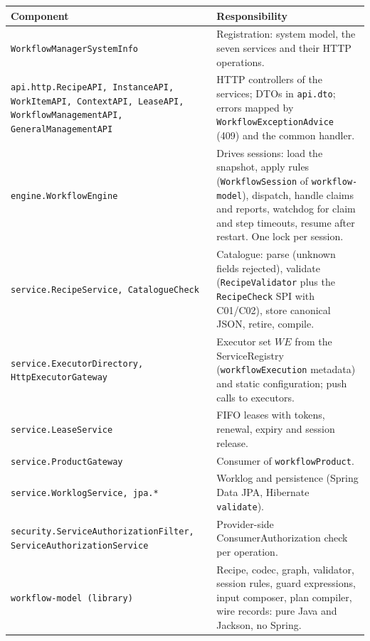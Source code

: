 \documentclass[a4paper]{arrowhead}
\begin{document}
{\small
\begin{longtable}{|p{6.2cm}|p{9.6cm}|}

\hline
\rowcolor{gray!33} Component & Responsibility \\ \hline
\endhead
{\footnotesize \texttt{WorkflowManagerSystemInfo}} & Registration: system model, the seven services and their HTTP operations. \\ \hline
{\footnotesize \texttt{api.\allowbreak{}http.\allowbreak{}RecipeAPI,\allowbreak{} InstanceAPI,\allowbreak{} WorkItemAPI,\allowbreak{} ContextAPI,\allowbreak{} LeaseAPI,\allowbreak{} WorkflowManagementAPI,\allowbreak{} GeneralManagementAPI}} & HTTP controllers of the services; DTOs in \texttt{api.dto}; errors mapped by \texttt{WorkflowExceptionAdvice} (409) and the common handler. \\ \hline
{\footnotesize \texttt{engine.\allowbreak{}WorkflowEngine}} & Drives sessions: load the snapshot, apply rules (\texttt{WorkflowSession} of \texttt{workflow-model}), dispatch, handle claims and reports, watchdog for claim and step timeouts, resume after restart. One lock per session. \\ \hline
{\footnotesize \texttt{service.\allowbreak{}RecipeService,\allowbreak{} CatalogueCheck}} & Catalogue: parse (unknown fields rejected), validate (\texttt{RecipeValidator} plus the \texttt{RecipeCheck} SPI with C01/C02), store canonical JSON, retire, compile. \\ \hline
{\footnotesize \texttt{service.\allowbreak{}ExecutorDirectory,\allowbreak{} HttpExecutorGateway}} & Executor set $WE$ from the ServiceRegistry (\texttt{workflowExecution} metadata) and static configuration; push calls to executors. \\ \hline
{\footnotesize \texttt{service.\allowbreak{}LeaseService}} & FIFO leases with tokens, renewal, expiry and session release. \\ \hline
{\footnotesize \texttt{service.\allowbreak{}ProductGateway}} & Consumer of \texttt{workflowProduct}. \\ \hline
{\footnotesize \texttt{service.\allowbreak{}WorklogService,\allowbreak{} jpa.\allowbreak{}*}} & Worklog and persistence (Spring Data JPA, Hibernate \texttt{validate}). \\ \hline
{\footnotesize \texttt{security.\allowbreak{}ServiceAuthorizationFilter,\allowbreak{} ServiceAuthorizationService}} & Provider-side ConsumerAuthorization check per operation. \\ \hline
{\footnotesize \texttt{workflow-\allowbreak{}model (library)}} & Recipe, codec, graph, validator, session rules, guard expressions, input composer, plan compiler, wire records: pure Java and Jackson, no Spring. \\ \hline
\end{longtable}
}
\end{document}
